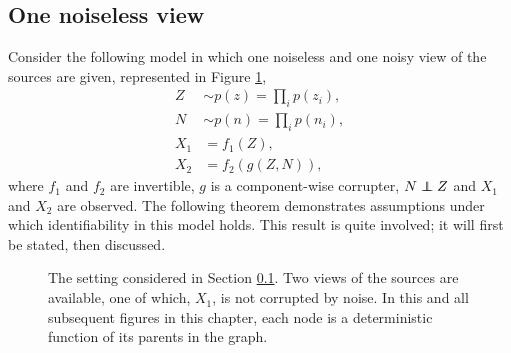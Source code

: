 \subsection{One noiseless view}
\label{sec:onenoisless}
Consider the following model in which one noiseless and one noisy view of the sources are given, represented in Figure \ref{fig:generalized_hsr_basic}, 
%
\begin{align}
Z &\sim p(z) = \prod_{i} p(z_i), \label{eq:indep}\\
N &\sim p(n) = \prod_{i} p(n_i), \nonumber  \\
X_{1}&= f_{1}(Z) \label{eq:sem2_1}, \\
X_{2}&= f_{2}( g(Z, N)) \label{eq:sem2_2},
\end{align}
%
where $f_1$ and $f_2$ are invertible, $g$ is a component-wise corrupter, $N \independent Z$ and $X_1$ and $X_2$ are observed.
The following theorem demonstrates assumptions under which identifiability in this model holds.
This result is quite involved; it will first be stated, then discussed.

\begin{figure}[t!]
	\centering
	\caption[Two-view ICA with one noiseless view]{The setting considered in Section \ref{sec:onenoisless}. Two views of the sources are available, one of which, $X_1$, is not corrupted by noise. In this and all subsequent figures in this chapter, each node is a deterministic function of its parents in the graph.
	}
	\label{fig:generalized_hsr_basic}
\end{figure}

\medskip

